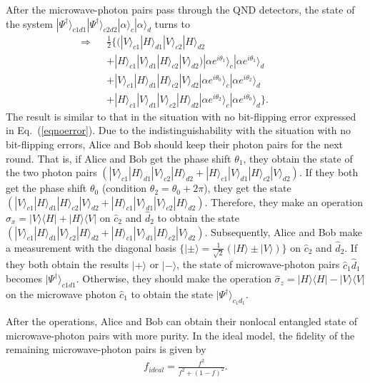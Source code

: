 \documentclass[showpacs,aps,graphicx,twocolumn]{revtex4}
\begin{document}
After the microwave-photon pairs pass through the QND detectors,
the state of the system
$|\Psi^{\dag}\rangle_{c1d1}|\Psi^{\dag}\rangle_{c2d2}|\alpha\rangle_{c}|\alpha\rangle_{d}$
turns to
\begin{eqnarray}\label{eq13}
\Longrightarrow\!\!\!\!&&\frac{1}{2}\{(|V\rangle_{c1}|H\rangle_{d1}
|V\rangle_{c2}|H\rangle_{d2}\nonumber\\
&&+|H\rangle_{c1}|V\rangle_{d1}|H\rangle_{c2}|V\rangle_{d2})
|\alpha e^{i\theta_{1}}\rangle_{c}|\alpha e^{i\theta_{1}}\rangle_{d}\nonumber\\
&&+|V\rangle_{c1}|H\rangle_{d1}|H\rangle_{c2}|V\rangle_{d2}
|\alpha e^{i\theta_{0}}\rangle_{c}|\alpha e^{i\theta_{2}}\rangle_{d}\nonumber\\
&&+|H\rangle_{c1}|V\rangle_{d1}|V\rangle_{c2}|H\rangle_{d2} |\alpha
e^{i\theta_{2}}\rangle_{c}|\alpha
e^{i\theta_{0}}\rangle_{d}\}.\;\;\;\;\;\;\;\;
\end{eqnarray}
The result is similar to that in the situation with no bit-flipping
error expressed in Eq.~(\ref{eqnoerror}). Due to the
indistinguishability with the situation with no bit-flipping errors,
Alice and Bob should keep their photon pairs for the next round. That is, if Alice and
Bob get the phase shift $\theta_{1}$, they obtain the state of the two photon
pairs $(|V\rangle_{c1}|H\rangle_{d1}|V\rangle_{c2}|H\rangle_{d2}
+|H\rangle_{c1}|V\rangle_{d1}|H\rangle_{c2}|V\rangle_{d2})$. If they
both get the phase shift $\theta_{0}$ (condition $\theta_{2}=\theta_{0}+2\pi$), they get the state
$(|V\rangle_{c1}|H\rangle_{d1}|H\rangle_{c2}|V\rangle_{d2}
+|H\rangle_{c1}|V\rangle_{d1}|V\rangle_{c2}|H\rangle_{d2})$.
Therefore, they make an operation
$\hat{\sigma}_{x}=|V\rangle\langle H|+|H\rangle\langle V|$ on
$\hat{c}_{2}$ and $\hat{d}_{2}$ to obtain the state
$(|V\rangle_{c1}|H\rangle_{d1}|V\rangle_{c2}|H\rangle_{d2}
+|H\rangle_{c1}|V\rangle_{d1}|H\rangle_{c2}|V\rangle_{d2})$.
Subsequently, Alice and Bob make a measurement with the diagonal
basis $\{|\pm\rangle=\frac{1}{\sqrt{2}}(|H\rangle\pm|V\rangle)\}$ on
$\hat{c}_{2}$ and $\hat{d}_{2}$. If they both obtain the results
$|+\rangle$ or $|-\rangle$, the state of microwave-photon pairs
$\hat{c}_{1}\hat{d}_{1}$ becomes $|\Psi^{\dag}\rangle_{c1d1}$.
Otherwise, they should make the operation
$\hat{\sigma}_{z}=|H\rangle\langle H|-|V\rangle\langle V|$
on the microwave photon $\hat{c}_{1}$ to obtain the state
$|\Psi^{\dag}\rangle_{c_1d_1}$.


After the operations, Alice and Bob can obtain their nonlocal
entangled state of microwave-photon pairs with more purity.
In the ideal model, the fidelity of the
remaining microwave-photon pairs is given by
\begin{eqnarray}        \label{eq14}
f_{ideal}=\frac{f^{2}}{f^{2}+(1-f)^{2}}.
\end{eqnarray}
\end{document}
